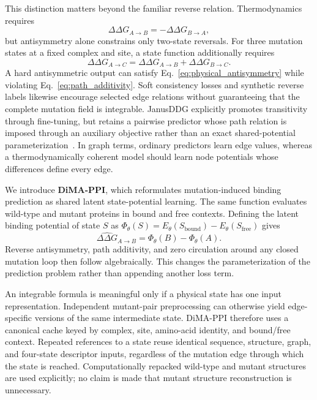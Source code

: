 \documentclass[preprint,12pt]{elsarticle}
\newcommand{\ddg}{\Delta\Delta G}
\begin{document}
This distinction matters beyond the familiar reverse relation. Thermodynamics requires
\begin{equation}
  \ddg_{A\rightarrow B}=-\ddg_{B\rightarrow A},
  \label{eq:physical_antisymmetry}
\end{equation}
but antisymmetry alone constrains only two-state reversals. For three mutation states at a fixed complex and site, a state function additionally requires
\begin{equation}
  \ddg_{A\rightarrow C}
  =\ddg_{A\rightarrow B}+\ddg_{B\rightarrow C}.
  \label{eq:path_additivity}
\end{equation}
A hard antisymmetric output can satisfy Eq.~\eqref{eq:physical_antisymmetry} while violating Eq.~\eqref{eq:path_additivity}. Soft consistency losses and synthetic reverse labels likewise encourage selected edge relations without guaranteeing that the complete mutation field is integrable. JanusDDG explicitly promotes transitivity through fine-tuning, but retains a pairwise predictor whose path relation is imposed through an auxiliary objective rather than an exact shared-potential parameterization~\cite{janusddg}. In graph terms, ordinary predictors learn edge values, whereas a thermodynamically coherent model should learn node potentials whose differences define every edge.

We introduce \textbf{DiMA-PPI}, which reformulates mutation-induced binding prediction as shared latent state-potential learning. The same function evaluates wild-type and mutant proteins in bound and free contexts. Defining the latent binding potential of state $S$ as $\Phi_\theta(S)=E_\theta(S_{\mathrm{bound}})-E_\theta(S_{\mathrm{free}})$ gives
\begin{equation}
  \widehat{\ddg}_{A\rightarrow B}=\Phi_\theta(B)-\Phi_\theta(A).
  \label{eq:potential_difference_intro}
\end{equation}
Reverse antisymmetry, path additivity, and zero circulation around any closed mutation loop then follow algebraically. This changes the parameterization of the prediction problem rather than appending another loss term.

An integrable formula is meaningful only if a physical state has one input representation. Independent mutant-pair preprocessing can otherwise yield edge-specific versions of the same intermediate state. DiMA-PPI therefore uses a canonical cache keyed by complex, site, amino-acid identity, and bound/free context. Repeated references to a state reuse identical sequence, structure, graph, and four-state descriptor inputs, regardless of the mutation edge through which the state is reached. Computationally repacked wild-type and mutant structures are used explicitly; no claim is made that mutant structure reconstruction is unnecessary.
\end{document}
